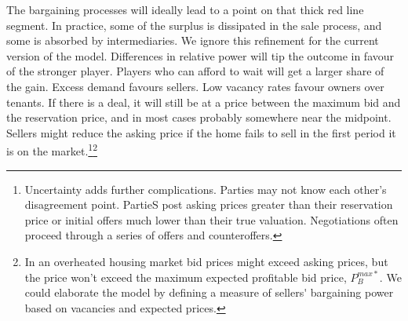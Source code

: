 The bargaining processes will ideally lead to a point on that thick red line segment. In practice, some of the surplus is dissipated in the sale process, and some is absorbed by intermediaries. We ignore this refinement for the current version of the model. Differences in relative power will tip the outcome in favour of the stronger player.   Players who can afford to wait will get a larger share of the gain. Excess demand favours sellers. Low vacancy rates favour owners over tenants.   If there is a deal, it will still be at a price between the maximum bid and the reservation price, and in most cases probably somewhere near the midpoint. Sellers might reduce the asking price if the home fails to sell in the first period it is on the market.\footnote{Uncertainty adds further complications. Parties may not know each other's disagreement point. PartieS post asking prices greater than their reservation price or initial offers much lower than their true valuation.  
Negotiations often proceed through a series of offers and counteroffers.}\;\footnote{In an overheated housing market bid prices might exceed asking prices, but the price won't exceed the maximum expected profitable bid price, $P_B^{max*}$. We could elaborate the model by defining a measure of \gls{sellers' bargaining power} based on vacancies and expected prices.}   %


 




